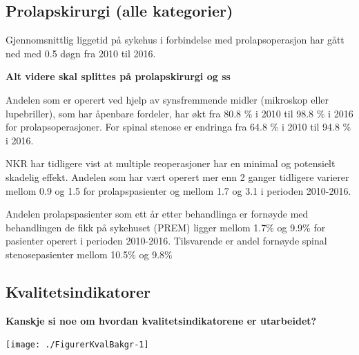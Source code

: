 \documentclass [norsk,a4paper,twoside]{article}\usepackage[]{graphicx}\usepackage[]{color}
\newenvironment{knitrout}{}{} %
\begin{document}
\subsection{Prolapskirurgi (alle kategorier)}



Gjennomsnittlig liggetid på sykehus i forbindelse med prolapsoperasjon har gått ned med 0.5 døgn fra 2010 til 2016.



\textbf{Alt videre skal splittes på prolapskirurgi og ss}



Andelen som er operert ved hjelp av synsfremmende midler (mikroskop eller
lupebriller), som har åpenbare fordeler, har økt fra 80.8 \% i 2010 til 
98.8 \% i 2016 for prolapsoperasjoner. For spinal stenose er endringa fra 64.8 \% i 2010 til 
94.8 \% i 2016.

NKR har tidligere vist at multiple reoperasjoner har en minimal og potensielt skadelig
effekt. Andelen som har vært operert mer enn 2 ganger tidligere varierer mellom 0.9 
og 1.5 for prolapspasienter og mellom 1.7 
og 3.1 i perioden 2010-2016. 

Andelen prolapspasienter som ett år etter behandlinga er fornøyde med behandlingen de fikk på sykehuset (PREM) ligger mellom 1.7\% og 9.9\% for pasienter operert i perioden 2010-2016. Tilsvarende er andel fornøyde spinal stenosepasienter mellom 10.5\% og 9.8\%

\subsection{Kvalitetsindikatorer}

\textbf{Kanskje si noe om hvordan kvalitetsindikatorene er utarbeidet?}\\ 


\begin{knitrout}
\color{fgcolor}

{\centering \texttt{[image: ./FigurerKvalBakgr-1]} 

}



\end{knitrout}
\end{document}
